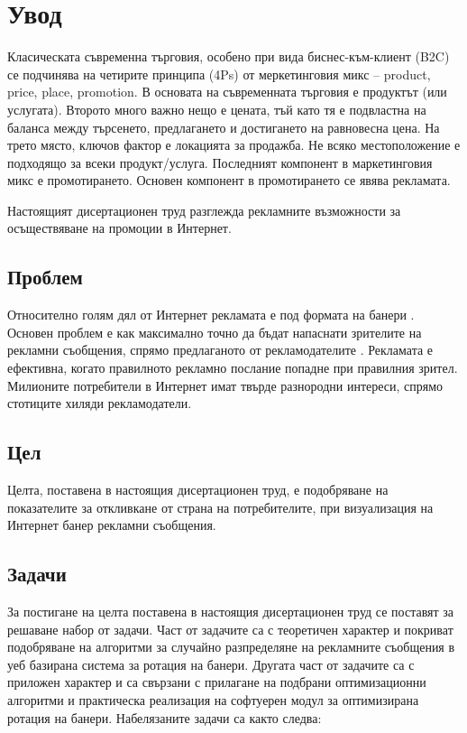 \chapter*{Увод}

Класическата съвременна търговия, особено при вида биснес-към-клиент (B2C) се подчинява на четирите принципа (4Ps) от меркетинговия микс – product, price, place, promotion. В основата на съвременната търговия е продуктът (или услугата). Второто много важно нещо е цената, тъй като тя е подвластна на баланса между търсенето, предлагането и достигането на равновесна цена. На трето място, ключов фактор е локацията за продажба. Не всяко местоположение е подходящо за всеки продукт/услуга. Последният компонент в маркетинговия микс е промотирането. Основен компонент в промотирането се явява рекламата. 

Настоящият дисертационен труд разглежда рекламните възможности за осъществяване на промоции в Интернет. 

\section*{Проблем}

Относително голям дял от Интернет рекламата е под формата на банери \cite{1597398}. Основен проблем е как максимално точно да бъдат напаснати зрителите на рекламни съобщения, спрямо предлаганото от рекламодателите \cite{MIRALLESPECHUAN201839}. Рекламата е ефективна, когато правилното рекламно послание попадне при правилния зрител. Милионите потребители в Интернет имат твърде разнородни интереси, спрямо стотиците хиляди рекламодатели. 

\section*{Цел}

Целта, поставена в настоящия дисертационен труд, е подобряване на показателите за откливкане от страна на потребителите, при визуализация на Интернет банер рекламни съобщения. 

\section*{Задачи}

За постигане на целта поставена в настоящия дисертационен труд се поставят за решаване набор от задачи. Част от задачите са с теоретичен характер и покриват подобряване на алгоритми за случайно разпределяне на рекламните съобщения в уеб базирана система за ротация на банери. Другата част от задачите са с приложен характер и са свързани с прилагане на подбрани оптимизационни алгоритми и практическа реализация на софтуерен модул за оптимизирана ротация на банери. Набелязаните задачи са както следва:

